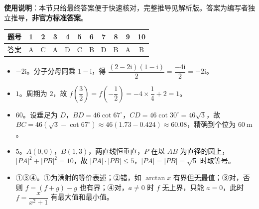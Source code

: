 
\begin{gknotice}
\textbf{使用说明}：本节只给最终答案便于快速核对，完整推导见解析版。答案为编写者独立推导，\textbf{非官方标准答案}。
\end{gknotice}

\begin{center}\begin{tabular}{ccccccccccc}
\toprule
题号 & 1 & 2 & 3 & 4 & 5 & 6 & 7 & 8 & 9 & 10 \\
\midrule
答案 & A & C & A & D & C & B & D & B & A & B \\
\bottomrule
\end{tabular}\end{center}

\begin{itemize}[leftmargin=2.6em]
  \item[\textbf{11.}] $-2\mathrm i$。分子分母同乘 $1-\mathrm i$，得 $\dfrac{(2-2\mathrm i)(1-\mathrm i)}2=\dfrac{-4\mathrm i}2=-2\mathrm i$。
  \item[\textbf{12.}] $1$。周期为 $2$，故 $f\left(\dfrac32\right)=f\left(-\dfrac12\right)=-4\times\dfrac14+2=1$。
  \item[\textbf{13.}] $60$。设垂足为 $D$，$BD=46\cot67^\circ$，$CD=46\cot30^\circ=46\sqrt3$，故 $BC=46(\sqrt3-\cot67^\circ)\approx 46(1.73-0.424)\approx 60.08$，精确到个位为 $60\ \mathrm m$。
  \item[\textbf{14.}] $5$。$A(0,0)$，$B(1,3)$，两直线恒垂直，$P$ 在以 $AB$ 为直径的圆上，$|PA|^2+|PB|^2=10$，故 $|PA|\cdot|PB|\leqslant 5$，$|PA|=|PB|=\sqrt5$ 时取等号。
  \item[\textbf{15.}] ①③④。①为满射的等价表述；②错，如 $\arctan x$ 有界但无最值；③对，否则 $f=(f+g)-g$ 也有界；④对，$a\neq 0$ 时 $f$ 无上界，只能 $a=0$，此时 $f=\dfrac{x}{x^2+1}$ 有最大值和最小值。
\end{itemize}

